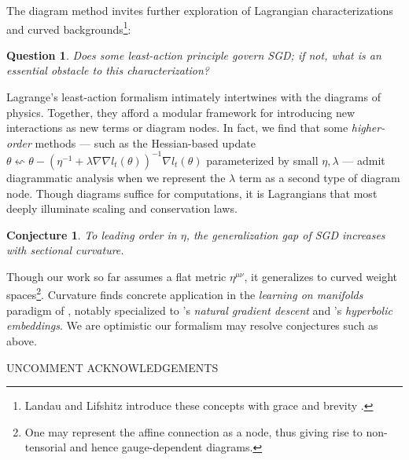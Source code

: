 \documentclass{article}
\theoremstyle{plain}
\newtheorem{conj}{Conjecture}
\newtheorem{quest}{Question}
\theoremstyle{definition}
\begin{document}
    The diagram method invites further exploration of Lagrangian
    characterizations and curved backgrounds\footnote{
        Landau and Lifshitz introduce these concepts with grace and brevity
        .
    }:
    \begin{quest}
        Does some least-action principle govern SGD; if not,
        what is an essential obstacle to this characterization?
    \end{quest}
        Lagrange's least-action formalism intimately intertwines with the
        diagrams of physics.  Together, they afford a modular framework for
        introducing new interactions as new terms or diagram nodes.  In fact,
        we find that some \emph{higher-order} methods --- such as the
        Hessian-based update
        $
            \theta \leftsquigarrow
            \theta -
            (\eta^{-1} + \lambda \nabla \nabla l_t(\theta))^{-1}
            \nabla l_t(\theta)
        $
        parameterized by small $\eta, \lambda$ --- admit diagrammatic analysis
        when we represent the $\lambda$ term as a second type of
        diagram node.  Though diagrams suffice for computations, it is
        Lagrangians that most deeply illuminate scaling and conservation laws.
    \begin{conj}
        To leading order in $\eta$, the generalization gap of SGD  
        increases with sectional curvature.
    \end{conj}
        Though our work so far assumes a flat metric $\eta^{\mu\nu}$, it 
        generalizes to curved weight spaces\footnote{
            One may represent the affine connection as a node, thus giving
            rise to non-tensorial and hence gauge-dependent diagrams.
        }.
        Curvature finds concrete application in the \emph{learning on
        manifolds} paradigm of \citet{bo13}, notably specialized to
        \citet{am98}'s \emph{natural gradient descent} and \citet{ni17}'s
        \emph{hyperbolic embeddings}.  We are optimistic our formalism may
        resolve conjectures such as above.


{\color{moor} UNCOMMENT ACKNOWLEDGEMENTS}
\end{document}
